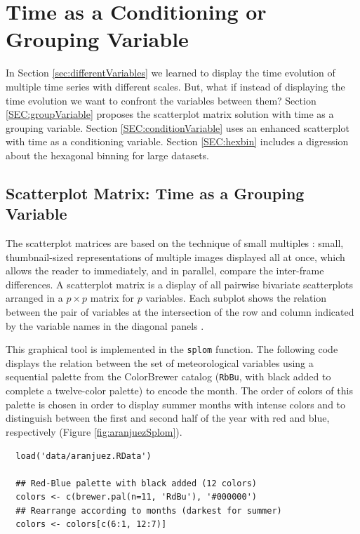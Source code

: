 \documentclass[smallroyalvopaper]{memoir}
\begin{document}
\chapter{Time as a Conditioning or Grouping Variable}
\label{sec:orgd842b89}
\label{cha:timeGroupFactor}

In Section \ref{sec:differentVariables} we learned to display the time evolution of multiple time series with different scales. But, what if instead of displaying the time evolution we want to confront the variables between them? Section \ref{SEC:groupVariable} proposes the scatterplot matrix solution with time as a grouping variable. Section \ref{SEC:conditionVariable} uses an enhanced scatterplot with time as a conditioning variable. Section \ref{SEC:hexbin} includes a digression about the hexagonal binning for large datasets.

\section{Scatterplot Matrix: Time as a Grouping Variable \label{SEC:groupVariable}}
\label{sec:org3632fd6}

The scatterplot matrices are based on the technique of small multiples
\cite{Tufte1990}: small, thumbnail-sized representations of multiple
images displayed all at once, which allows the reader to immediately,
and in parallel, compare the inter-frame differences.  A scatterplot
matrix is a display of all pairwise bivariate scatterplots arranged in
a \(p \times p\) matrix for \(p\) variables. Each subplot shows the
relation between the pair of variables at the intersection of the row
and column indicated by the variable names in the diagonal panels
\cite{Friendly.Denis2005}.

This graphical tool is implemented in the \texttt{splom} function. The
following code displays the relation between the set of
meteorological variables using a sequential palette from the
ColorBrewer catalog (\texttt{RbBu}, with black added to complete a
twelve-color palette) to encode the month. The order of colors of
this palette is chosen in order to display summer months with
intense colors and to distinguish between the first and second
half of the year with red and blue, respectively (Figure
\ref{fig:aranjuezSplom}).


\lstset{language=r,label= ,caption= ,captionpos=b,numbers=none}
\begin{lstlisting}
  load('data/aranjuez.RData')
  
  ## Red-Blue palette with black added (12 colors)
  colors <- c(brewer.pal(n=11, 'RdBu'), '#000000')
  ## Rearrange according to months (darkest for summer)
  colors <- colors[c(6:1, 12:7)]
\end{lstlisting}
\end{document}
